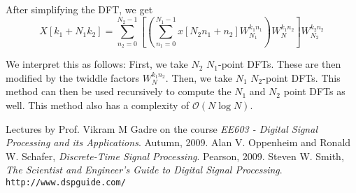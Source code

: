 \documentclass{article}
\theoremstyle{definition}
\begin{document}
After simplifying the DFT, we get 
\[
    X[k_1 + N_1 k_2] = \sum_{n_2=0}^{N_2 -1} \left[ \left( \sum_{n_1=0}^{N_1 -1} x[N_2n_1 + n_2] W_{N_1}^{k_1n_1} \right) W_{N}^{k_1n_2} \right] W_{N_2}^{k_2n_2}
\]

We interpret this as follows: First, we take $N_2$ $N_1$-point DFTs. These are then modified by the twiddle factors $W_{N}^{k_1n_2}$. Then, we take $N_1$ $N_2$-point DFTs. This method can then be used recursively to compute the $N_1$ and $N_2$ point DFTs as well. This method also has a complexity of $\mathcal{O}(N \log N)$.



%



\begin{thebibliography}{9}
Lectures by Prof. Vikram M Gadre on the course \textit{EE603 - Digital Signal Processing and its Applications}. 
Autumn, 2009.
Alan V. Oppenheim and Ronald W. Schafer, \textit{Discrete-Time Signal Processing}.
Pearson, 2009.
Steven W. Smith, \textit{The Scientist and Engineer's Guide to Digital Signal Processing}. 
\\\texttt{http://www.dspguide.com/}
\end{thebibliography}
\end{document}
